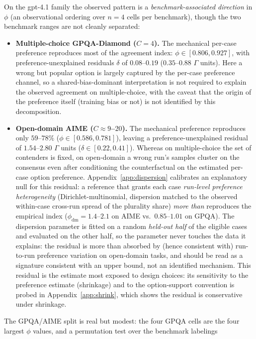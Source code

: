 \documentclass[a4paper,fleqn]{cas-sc}
\newcommand{\agreementIndex}{\Gamma}
\begin{document}
On the gpt-4.1 family the observed pattern is a
\emph{benchmark-associated direction} in
$\phi$ (an observational ordering over $n=4$ cells per benchmark),
though the two benchmark ranges are not cleanly separated:
\begin{itemize}
\item \textbf{Multiple-choice GPQA-Diamond ($C=4$).} The mechanical
  per-case preference reproduces most of the agreement index:
  $\phi\in[0.806,0.927]$, with preference-unexplained residuals $\delta$ of
  $0.08$--$0.19$ ($0.35$--$0.88$ $\agreementIndex$ units). Here a wrong but popular
  option is largely captured by the
  per-case preference channel, so a shared-bias-dominant interpretation
  is not required to explain the observed agreement on
  multiple-choice, with the
  caveat that the origin of the preference itself (training bias or not)
  is not identified by this decomposition.
\item \textbf{Open-domain AIME ($C\approx9$--$20$).} The mechanical
  preference reproduces only $59$--$78\%$
  ($\phi\in[0.586,0.781]$), leaving a preference-unexplained residual of
  $1.54$--$2.80$ $\agreementIndex$ units ($\delta\in[0.22,0.41]$). Whereas on
  multiple-choice the set of contenders is fixed, on open-domain
  a wrong run's samples cluster on the consensus even after
  conditioning the counterfactual on the estimated per-case option preference. Appendix~\ref{app:dispersion}
  calibrates an explanatory null for this residual: a reference that grants
  each case \emph{run-level preference heterogeneity}
  (Dirichlet-multinomial, dispersion matched to the observed
  within-case cross-run spread of the plurality share) \emph{more than}
  reproduces the empirical index ($\phi_{\mathrm{dm}}=1.4$--$2.1$ on
  AIME vs.\ $0.85$--$1.01$ on GPQA). The dispersion parameter is fitted on a random \emph{held-out half} of the eligible cases and evaluated on the other half, so the parameter never touches the data it explains: the residual is more than absorbed by (hence consistent with)
  run-to-run preference variation
  on open-domain tasks, and should be read as a
  signature consistent with an upper bound, not an identified mechanism. This
  residual is the estimate most exposed to design choices: its
  sensitivity to the preference estimate (shrinkage) and to the
  option-support convention is probed in
  Appendix~\ref{app:shrink}, which shows the residual is conservative
  under shrinkage.
\end{itemize}
The GPQA/AIME split is real but modest: the four GPQA cells are the four
largest $\phi$ values, and a permutation test over the benchmark labelings
\end{document}
